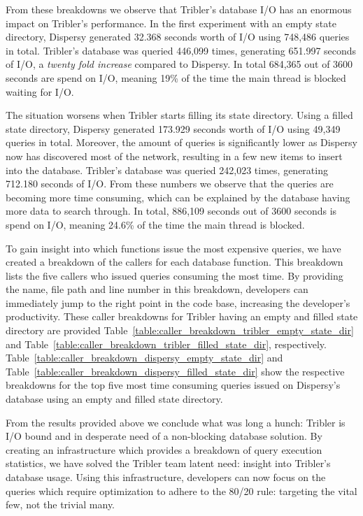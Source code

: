 From these breakdowns we observe that Tribler's database I/O has an enormous impact on Tribler's performance.
In the first experiment with an empty state directory, Dispersy generated 32.368 seconds worth of I/O using 748,486 queries in total. 
Tribler's database was queried 446,099 times, generating 651.997 seconds of I/O, a \emph{twenty fold increase} compared to Dispersy.
In total 684,365 out of 3600 seconds are spend on I/O, meaning 19\% of the time the main thread is blocked waiting for I/O.

The situation worsens when Tribler starts filling its state directory.
Using a filled state directory, Dispersy generated 173.929 seconds worth of I/O using 49,349 queries in total.
Moreover, the amount of queries is significantly lower as Dispersy now has discovered most of the network, resulting in a few new items to insert into the database.
Tribler's database was queried 242,023 times, generating 712.180 seconds of I/O.
From these numbers we observe that the queries are becoming more time consuming, which can be explained by the database having more data to search through.
In total, 886,109 seconds out of 3600 seconds is spend on I/O, meaning 24.6\% of the time the main thread is blocked.

To gain insight into which functions issue the most expensive queries, we have created a breakdown of the callers for each database function.
This breakdown lists the five callers who issued queries consuming the most time.
By providing the name, file path and line number in this breakdown, developers can immediately jump to the right point in the code base, increasing the developer's productivity.
These caller breakdowns for Tribler having an empty and filled state directory are provided Table~\ref{table:caller_breakdown_tribler_empty_state_dir} and Table~\ref{table:caller_breakdown_tribler_filled_state_dir}, respectively.
Table~\ref{table:caller_breakdown_dispersy_empty_state_dir} and Table~\ref{table:caller_breakdown_dispersy_filled_state_dir} show the respective breakdowns for the top five most time consuming queries issued on Dispersy's database using an empty and filled state directory.

From the results provided above we conclude what was long a hunch: Tribler is I/O bound and in desperate need of a non-blocking database solution.
By creating an infrastructure which provides a breakdown of query execution statistics, we have solved the Tribler team latent need: insight into Tribler's database usage.
Using this infrastructure, developers can now focus on the queries which require optimization to adhere to the 80/20 rule: targeting the vital few, not the trivial many.

